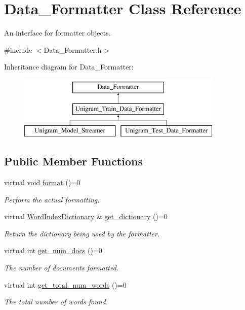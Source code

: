 \hypertarget{class_data___formatter}{
\section{Data\_\-Formatter Class Reference}
\label{class_data___formatter}
}


An interface for formatter objects.  




{\ttfamily \#include $<$Data\_\-Formatter.h$>$}

Inheritance diagram for Data\_\-Formatter:\begin{figure}[H]
\begin{center}
\leavevmode
\includegraphics[height=3cm]{class_data___formatter}
\end{center}
\end{figure}
\subsection*{Public Member Functions}
\begin{DoxyCompactItemize}
\item 
virtual void \hyperlink{class_data___formatter_a4180972aaff1249e0290c3544665403d}{format} ()=0
\begin{DoxyCompactList}\small\item\em Perform the actual formatting. \item\end{DoxyCompactList}\item 
virtual \hyperlink{class_word_index_dictionary}{WordIndexDictionary} \& \hyperlink{class_data___formatter_ad7371376f95eddd15fb197a729b28c50}{get\_\-dictionary} ()=0
\begin{DoxyCompactList}\small\item\em Return the dictionary being used by the formatter. \item\end{DoxyCompactList}\item 
virtual int \hyperlink{class_data___formatter_aec61a89d2fc394ac8f28fb502357c90e}{get\_\-num\_\-docs} ()=0
\begin{DoxyCompactList}\small\item\em The number of documents formatted. \item\end{DoxyCompactList}\item 
virtual int \hyperlink{class_data___formatter_aec312da75df72aa23974051db72e4b69}{get\_\-total\_\-num\_\-words} ()=0
\begin{DoxyCompactList}\small\item\em The total number of words found. \item\end{DoxyCompactList}\end{DoxyCompactItemize}


